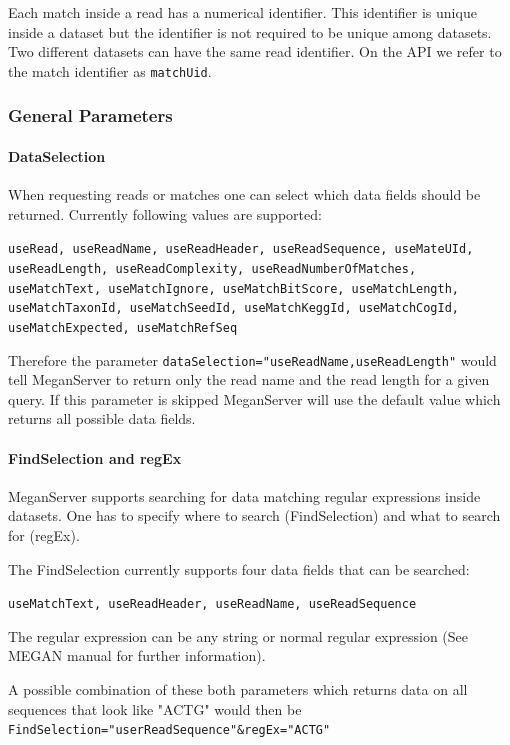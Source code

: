 \documentclass[11pt]{article}
\begin{document}
Each match inside a read has a numerical identifier. This identifier is unique inside a dataset but the identifier is not required to be unique among datasets. Two different datasets can have the same read identifier. On the API we refer to the match identifier as \texttt{matchUid}.


\subsubsection{General Parameters}

\paragraph{DataSelection}
\label{subsec:datasel}

When requesting reads or matches one can select which data fields should be returned. Currently following values are supported:


\texttt{useRead, useReadName, useReadHeader, useReadSequence, useMateUId, useReadLength, useReadComplexity, useReadNumberOfMatches, useMatchText, useMatchIgnore, useMatchBitScore, useMatchLength, useMatchTaxonId, useMatchSeedId, useMatchKeggId, useMatchCogId, useMatchExpected, useMatchRefSeq}

Therefore the parameter \texttt{dataSelection="useReadName,useReadLength"} would tell MeganServer to return only the read name and the read length for a given query. If this parameter is skipped MeganServer will use the default value which returns all possible data fields.






\paragraph{FindSelection and regEx}
\label{subsec:findsel}
MeganServer supports searching for data matching regular expressions inside datasets. One has to specify where to search (FindSelection) and what to search for (regEx).

The FindSelection currently supports four data fields that can be searched:

\texttt{useMatchText, useReadHeader, useReadName, useReadSequence}

The regular expression can be any string or normal regular expression (See MEGAN manual for further information).

A possible combination of these both parameters which returns data on all sequences that look like "ACTG" would then be \texttt{FindSelection="userReadSequence"\&regEx="ACTG"}
\end{document}
